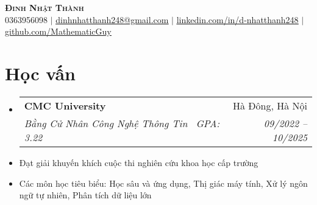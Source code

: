 \documentclass[letterpaper,11pt]{article}
\makeatletter
\newcommand{\resumeItem}[1]{
	\item\small{
	{#1 \vspace{-2pt}}
	}
}
\newcommand{\resumeSubheading}[4]{
	\vspace{-2pt}\item
	\begin{tabular*}{0.97\textwidth}[t]{l@{\extracolsep{\fill}}r}
		\textbf{#1} & #2 \\
		\textit{\small#3} & \textit{\small #4} \\
	\end{tabular*}\vspace{-7pt}
}
\newcommand{\resumeSubHeadingListStart}{\begin{itemize}[leftmargin=0.15in, label={}]}
\newcommand{\resumeSubHeadingListEnd}{\end{itemize}}
\makeatother
\begin{document}

\begin{center}
    \textbf{\Huge \scshape Đinh Nhật Thành} \\ \vspace{1pt}
    \small 0363956098 $|$ \href{mailto:x@x.com}{\underline{dinhnhatthanh248@gmail.com}} $|$
    \href{https://linkedin.com/in/...}{\underline{linkedin.com/in/d-nhatthanh248}} $|$
    \href{https://github.com/...}{\underline{github.com/MathematicGuy}}
\end{center}


\section{Học vấn}
	\resumeSubHeadingListStart
	\resumeSubheading
		{CMC University} {Hà Đông, Hà Nội}
		{Bằng Cử Nhân Công Nghệ Thông Tin \textbar \ GPA: 3.22}{09/2022 -- 10/2025}
		\resumeItem{Đạt giải khuyến khích cuộc thi nghiên cứu khoa học cấp trường}
		\resumeItem{Các môn học tiêu biểu: Học sâu và ứng dụng, Thị giác máy tính, Xử lý ngôn ngữ tự nhiên, Phân tích dữ liệu lớn}
	\resumeSubHeadingListEnd

\end{document}
